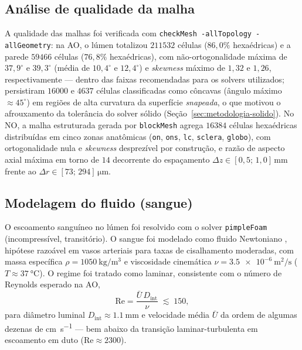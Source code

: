 \subsection{Análise de qualidade da malha}
\label{sec:metodologia-malha-qualidade}

A qualidade das malhas foi verificada com \texttt{checkMesh -allTopology -allGeometry}: na AO, o lúmen totalizou \(\num{211532}\) células (\(86{,}0\%\) hexaédricas) e a parede \(\num{59466}\) células (\(76{,}8\%\) hexaédricas), com não-ortogonalidade máxima de \(37{,}9^{\circ}\) e \(39{,}3^{\circ}\) (média de \(10{,}4^{\circ}\) e \(12{,}4^{\circ}\)) e \emph{skewness} máximo de \(1{,}32\) e \(1{,}26\), respectivamente --- dentro das faixas recomendadas para os solvers utilizados; persistiram \(\num{16000}\) e \(\num{4637}\) células classificadas como côncavas (ângulo máximo \(\approx 45^{\circ}\)) em regiões de alta curvatura da superfície \emph{snapeada}, o que motivou o afrouxamento da tolerância do solver sólido (Seção~\ref{sec:metodologia-solido}). No NO, a malha estruturada gerada por \texttt{blockMesh} agrega \(\num{16384}\) células hexaédricas distribuídas em cinco zonas anatômicas (\texttt{on}, \texttt{ons}, \texttt{lc}, \texttt{sclera}, \texttt{globo}), com ortogonalidade nula e \emph{skewness} desprezível por construção, e razão de aspecto axial máxima em torno de \(14\) decorrente do espaçamento \(\Delta z \in [0{,}5;\,1{,}0]\,\si{\milli\meter}\) frente ao \(\Delta r \in [73;\,294]\,\si{\micro\meter}\).

\subsection{Modelagem do fluido (sangue)}
\label{sec:metodologia-fluido}

O escoamento sanguíneo no lúmen foi resolvido com o solver
\texttt{pimpleFoam} (incompressível, transitório). O sangue foi modelado como
fluido Newtoniano \citep{Pedley1980}, hipótese razoável em vasos arteriais
para taxas de cisalhamento moderadas, com massa específica
\(\rho = \SI{1050}{\kilogram\per\meter\cubed}\) e viscosidade cinemática
\(\nu = \SI{3,5e-6}{\square\meter\per\second}\) (\(T \approx \SI{37}{\celsius}\)).
O regime foi tratado como laminar, consistente com o número de Reynolds
esperado na AO,
\begin{equation}
  \mathrm{Re} = \frac{\bar U\, D_{\mathrm{int}}}{\nu} \;\lesssim\; 150,
  \label{eq:Re}
\end{equation}
para diâmetro luminal \(D_{\mathrm{int}} \approx \SI{1,1}{\milli\meter}\) e
velocidade média \(\bar U\) da ordem de algumas dezenas de
\si{\centi\meter\per\second} --- bem abaixo da transição laminar-turbulenta
em escoamento em duto (\(\mathrm{Re} \approx 2300\)).

